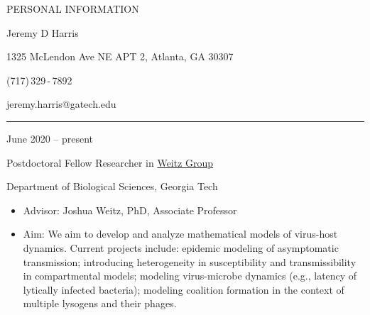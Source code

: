 \documentclass[a4paper,10pt]{article}
\newlength{\cvcolumngapwidth}
\newlength{\cvleftcolumnwidth}
\newlength{\cvrightcolumnwidth}
\newcommand{\cvnamestyle}[1]{{\Large\cvnamefont\textcolor{cvnamecolor}{#1}}}
\newcommand{\cvsectionstyle}[1]{{\normalsize\cvsectionfont\textcolor{cvsectioncolor}{#1}}}
\newcommand{\cvtitlestyle}[1]{{\large\cvtitlefont\textcolor{cvtitlecolor}{#1}}}
\newcommand{\cvdurationstyle}[1]{{\small\cvdurationfont\textcolor{cvdurationcolor}{#1}}}
\newlength{\cvafteritemskipamount}
\newlength{\cvaftersectionskipamount}
\newlength{\cvafternameskipamount}
\newlength{\cvafterpersonalinfolineskipamount}
\newlength{\cvaftertitleskipamount}
\newlength{\cvparskip}
\newcommand{\cvpersonalinfo}[2]{
            \begin{minipage}[t]{\cvleftcolumnwidth}
                \vspace{0mm} %
                \raggedleft #1
            \end{minipage}%
            \hspace{\cvcolumngapwidth}%
            \begin{minipage}[t]{\cvrightcolumnwidth}
                \vspace{0mm} %
                #2
            \end{minipage}
        
            \vspace{\cvafteritemskipamount}
        }
\newcommand{\cvname}[1]{
            \cvnamestyle{#1}
        
            \vspace{\cvafternameskipamount}
        }
\newcommand{\cvpersonalinfolinewithicon}[3]{
            \raisebox{.5\fontcharht\font`E-.5\height}{\texttt{[image: \#2]}}
            #3
        
            \vspace{\cvafterpersonalinfolineskipamount}
        }
\newcommand{\cvsection}[1]{
            \begin{minipage}[t]{\cvleftcolumnwidth}
                \raggedleft\cvsectionstyle{#1}
            \end{minipage}%
            \hspace{\cvcolumngapwidth}%
            \begin{minipage}[t]{\cvrightcolumnwidth}
                \textcolor{cvrulecolor}{\rule{\cvrightcolumnwidth}{0.3mm}}
            \end{minipage}
        
            \vspace{\cvaftersectionskipamount}
        }
\newcommand{\cvitem}[2]{
            \begin{minipage}[t]{\cvleftcolumnwidth}
                \raggedleft #1
            \end{minipage}%
            \hspace{\cvcolumngapwidth}%
            \begin{minipage}[t]{\cvrightcolumnwidth}
                \setlength{\parskip}{\cvparskip} #2
            \end{minipage}
        
            \vspace{\cvafteritemskipamount}
        }
\newcommand{\cvtitle}[1]{
            \cvtitlestyle{#1}
        
            \vspace{\cvaftertitleskipamount}
            \vspace{-\cvparskip}
        }
\begin{document}
        
        
        
        \cvpersonalinfo{
            \cvsectionstyle{PERSONAL INFORMATION}
        }{
            \cvname{Jeremy D Harris}
        
            \cvpersonalinfolinewithicon{height=4mm}{resources/europasscv-icons/address_europass_icon.pdf}{
        1325 McLendon Ave NE APT 2, Atlanta, GA 30307
            }
        
            \cvpersonalinfolinewithicon{height=4mm}{resources/europasscv-icons/mobile_europass_icon.pdf}{
                (717)\,329\,-\,7892
            }
        
            \cvpersonalinfolinewithicon{height=4mm}{resources/europasscv-icons/mail_europass_icon.pdf}{
                jeremy.harris@gatech.edu
            }
        
        
        }
        
        
        
        \cvsection{WORK EXPERIENCE}
        
        \cvitem{
            \cvdurationstyle{June 2020 -- present}
        }{
            \cvtitle{Postdoctoral Fellow Researcher in \href{https://weitzgroup.biosci.gatech.edu/}{Weitz Group}}
        
        	Department of Biological Sciences, Georgia Tech%
        
            \begin{itemize}[leftmargin=*]
            	\item Advisor: Joshua Weitz, PhD, Associate Professor
                \item Aim: We aim to develop and analyze mathematical models of virus-host dynamics. Current projects include: epidemic modeling of asymptomatic transmission; introducing heterogeneity in susceptibility and transmissibility in compartmental models; modeling virus-microbe dynamics (e.g., latency of lytically infected bacteria); modeling coalition formation in the context of multiple lysogens and their phages.
        
            \end{itemize}
        }
        
\end{document}
